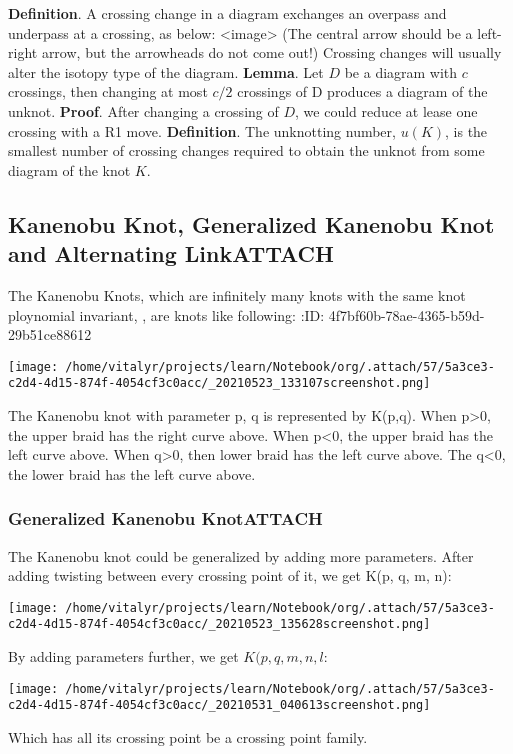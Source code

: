 \documentclass[lang=cn]{elegantpaper}
\begin{document}
\textbf{Definition}. A crossing change in a diagram exchanges an overpass and underpass at a crossing, as below:
<image>
(The central arrow should be a left-right arrow, but the arrowheads do not come out!)
Crossing changes will usually alter the isotopy type of the diagram.
\textbf{Lemma}. Let \(D\) be a diagram with \(c\) crossings, then changing at most \(c/2\) crossings of D produces a diagram of the unknot.
\textbf{Proof}. After changing a crossing of \(D\), we could reduce at lease one crossing with a R1 move.
\textbf{Definition}. The unknotting number, \(u(K)\), is the smallest number of crossing changes required to obtain the unknot from some diagram of the knot \(K\).

\subsection{Kanenobu Knot, Generalized Kanenobu Knot and Alternating Link\hfill{}\textsc{ATTACH}}
\label{sec:orga2c33f1}
The  Kanenobu Knots, which are infinitely many knots with the same knot ploynomial invariant, \cite{kanenobuInfinitelyManyKnots1986} , are knots like following:
:ID:       4f7bf60b-78ae-4365-b59d-29b51ce88612
\begin{center}
\texttt{[image: /home/vitalyr/projects/learn/Notebook/org/.attach/57/5a3ce3-c2d4-4d15-874f-4054cf3c0acc/\_20210523\_133107screenshot.png]}
\end{center}

The Kanenobu knot with parameter p, q is represented  by K(p,q). When p>0, the upper braid  has the right curve above. When p<0, the upper braid has the left curve above. When q>0, then lower braid has the left curve above. The q<0, the lower braid has the left curve above.

\subsubsection{Generalized Kanenobu Knot\hfill{}\textsc{ATTACH}}
\label{sec:org60fe2ce}
The Kanenobu knot could be generalized by adding more parameters. After adding twisting between every crossing point of it, we get K(p, q, m, n):
\begin{center}
\texttt{[image: /home/vitalyr/projects/learn/Notebook/org/.attach/57/5a3ce3-c2d4-4d15-874f-4054cf3c0acc/\_20210523\_135628screenshot.png]}
\end{center}

\cite{kanenobuInfinitelyManyKnots1986}
By adding parameters further, we get \(K(p, q, m, n, l\):
\begin{center}
\texttt{[image: /home/vitalyr/projects/learn/Notebook/org/.attach/57/5a3ce3-c2d4-4d15-874f-4054cf3c0acc/\_20210531\_040613screenshot.png]}
\end{center}
Which has all its crossing point be a crossing point family.
\end{document}
